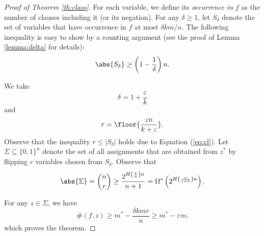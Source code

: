 \documentclass[11pt,a4paper]{article}
\theoremstyle{plain}
\newtheorem{lemma}{Lemma}
\theoremstyle{definition}
\begin{document}
\begin{proof}[Proof of Theorem \ref{th:class}]
For each variable, we define its \emph{occurrence in }$f$ as the number of clauses including it (or its negation). For any $\delta\ge 1$, let $S_\delta$ denote the set of variables that have occurrence in $f$ at most $\delta km/n$. 
The following inequality is easy to show by a counting argument (see the proof of Lemma \ref{lemma:delta} for details):
\begin{equation}\label{eq:cl}
\abs{S_\delta}\ge \left(1-\frac{1}{\delta}\right)n.
\end{equation}

We take 
\[
\delta = 1+\frac{\varepsilon}{k}
\]
and
\[
r=\floor{\frac{\varepsilon n}{k+\varepsilon}}.
\] 
Observe that the inequality $r\le |S_\delta|$ holds due to Equation (\ref{eq:cl}). Let $\Sigma\subseteq\{0,1\}^n$ denote the set of all assignments that are obtained from $z^\ast$ by flipping $r$ variables chosen from $S_\delta$. Observe that 
\[
\abs{\Sigma}= \binom{n}{r} \ge  \frac{2^{H\left(\frac{r}{n}\right) n}}{n+1}
=\Omega^\ast\left(2^{H\left(\frac{\varepsilon}{\varepsilon+k}\right) n}\right).
\]

For any $z\in \Sigma$, we have
\[
	\#(f,z)
	\ge m^\ast - \frac{\delta k m r}{n}
	\ge m^\ast - \varepsilon m.
\]
which proves the theorem.
\end{proof}

%
%
%	
\end{document}
